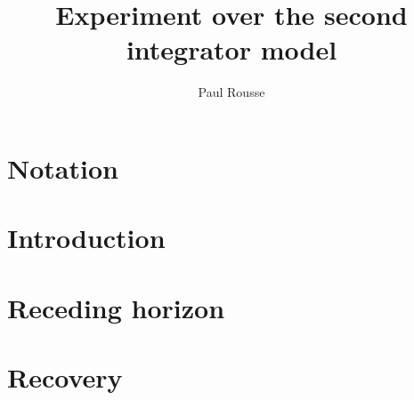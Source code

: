 \documentclass{article}
\theoremstyle{named}
\begin{document}
\title{Experiment over the second integrator model}
\author{Paul Rousse}

\maketitle

\section{Notation}

\section{Introduction}

\section{Receding horizon}

\section{Recovery}
\end{document}
